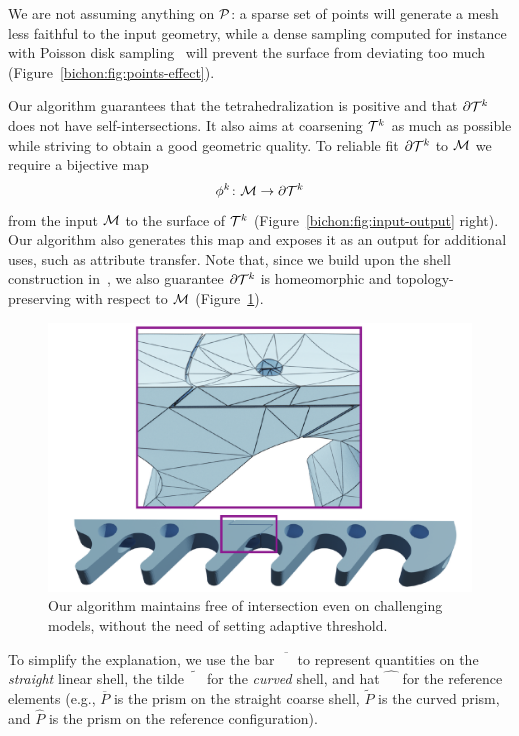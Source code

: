 We are not assuming anything on $\P$: a sparse set of points will generate a mesh less faithful to the input geometry, while a dense sampling computed for instance with Poisson disk sampling~\cite{bowers2010parallel} will prevent the surface from deviating too much (Figure~\ref{bichon:fig:points-effect}).


Our algorithm guarantees that the tetrahedralization is positive and that $\partial\T^k$ does not have self-intersections. 
It also aims at coarsening {$\T^k$} as much as possible while striving to obtain a good geometric quality. 
To reliable fit $\partial \T^k$ to $\M$ we require a bijective map
\[
\phi^k \colon \M \to \partial \T^k
\]
from the input $\M$ to the surface of $\T^k$ (Figure~\ref{bichon:fig:input-output} right). Our algorithm also generates this map and exposes it as an output for additional uses, such as attribute transfer. Note that, since we build upon the shell construction in~\cite{jiang2020bijective}, we also {guarantee} $\partial\T^k$ is homeomorphic and topology-preserving with respect to $\M$ (Figure~\ref{bichon:fig:intersection}).


\begin{figure}
    \centering
    \includegraphics[width=0.9\linewidth]{curve_meshing_in_shell_tex/figs/intersection-free.pdf}\hfill
    \caption{Our algorithm maintains {free of} intersection even on challenging models, without the need of setting adaptive threshold.}
    \label{bichon:fig:intersection}
\end{figure}




To simplify the explanation{,} we use the bar $\overline{\phantom{M}}$ to represent quantities on the \emph{straight} linear shell, the tilde $\widetilde{\phantom{M}}$ for the \emph{curved} shell, and hat $\hat{\phantom{M}}$ for the reference elements (e.g., $\overline P$ is the prism on {the} straight coarse shell, $\widetilde P$ is the curved prism, and $\hat P$ is the prism on the reference configuration).


